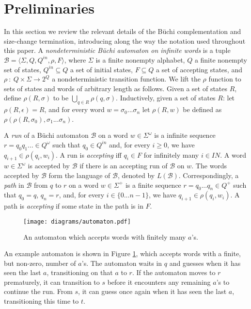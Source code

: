 \documentclass{LMCS}
\newcommand{\zug}[1]{\langle #1  \rangle}
\newcommand\buchi{B\"uchi }
\newcommand{\natnum}{\mbox{$I\!\!N$}}
\newcommand{\B}{{\mathcal B}}
\begin{document}
\section{Preliminaries} \label{Sect:Prelim} 

In this section we review the relevant details of the \buchi complementation and
size-change termination, introducing along the way the notation used throughout
this paper.  A \emph{nondeterministic \buchi automaton on infinite words} is a
tuple $\B=\zug{\Sigma, Q, Q^{in}, \rho, F}$, where $\Sigma$ is a finite nonempty
alphabet, $Q$ a finite nonempty set of states, $Q^{in} \subseteq Q$ a set of
initial states, $F \subseteq Q$ a set of accepting states, and $\rho~:~Q \times
\Sigma \rightarrow 2^Q$ a nondeterministic transition function. We lift the
$\rho$ function to sets of states and words of arbitrary length as follows.
Given a set of states $R$, define $\rho(R, \sigma)$ to be $\bigcup_{q \in R}
\rho(q,\sigma)$. Inductively, given a set of states $R$: let
$\rho(R,\epsilon)=R$, and for every word $w=\sigma_0...\sigma_n$ let $\rho(R,w)$ be
defined as $\rho(\rho(R,\sigma_0),\sigma_1...\sigma_n)$. 

A {\em run} of a \buchi automaton $\B$ on a word $w \in \Sigma^\omega$ is a
infinite sequence $r=q_0q_1... \in Q^\omega$ such that $q_0 \in
Q^{in}$ and, for every $i \geq 0$, we have $q_{i+1} \in \rho(q_i, w_i)$.  A run
is \emph{accepting} iff $q_i \in F$ for infinitely many $i \in \natnum$.  A word
$w \in \Sigma^\omega$ is accepted by $\B$ if there is an accepting run of $\B$
on $w$.  The words accepted by $\B$ form the language of $\B$, denoted by
$L(\B)$.  Correspondingly, a {\em path} in $\B$ from $q$ to $r$ on a word $w \in
\Sigma^+$ is a finite sequence $r=q_0...q_n \in Q^+$ such that
$q_0=q$, $q_n=r$, and, for every $i \in \{0...n-1\}$, we have $q_{i+1} \in
\rho(q_i, w_i)$.  A path is {\em accepting} if some state in the path is in $F$. 

\begin{figure}
\begin{center}
{\texttt{[image: diagrams/automaton.pdf]}}
\end{center}
\caption{An automaton which accepts words with finitely many $a$'s.}\label{fig:automaton}
\end{figure}

\begin{exa}
An example automaton is shown in Figure \ref{fig:automaton}, which accepts words with a finite, but
non-zero, number of
$a$'s. The automaton waits in $q$ and guesses when it has seen the last $a$, transitioning on that
$a$ to $r$. If the automaton moves to $r$ prematurely, it can transition to $s$ before it encounters
any remaining $a$'s to continue the run. From $s$, it can guess once again when it has seen the last
$a$, transitioning this time to $t$.
\end{exa}
\end{document}
